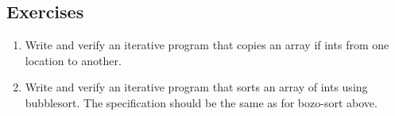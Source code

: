 
\subsection*{Exercises}

\begin{enumerate}
\item
Write and verify an iterative program that copies an array if ints from one
location to another.%
\item
Write and verify an iterative program that sorts an array of ints using
bubblesort. The specification should be the same as for bozo-sort above.
\end{enumerate}

